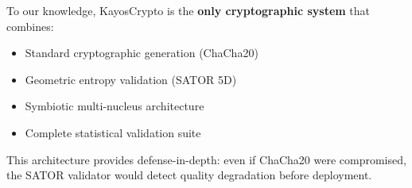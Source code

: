 To our knowledge, KayosCrypto is the \textbf{only cryptographic system} that combines:
\begin{itemize}
    \item Standard cryptographic generation (ChaCha20)
    \item Geometric entropy validation (SATOR 5D)
    \item Symbiotic multi-nucleus architecture
    \item Complete statistical validation suite
\end{itemize}

This architecture provides defense-in-depth: even if ChaCha20 were compromised, the SATOR validator would detect quality degradation before deployment.
